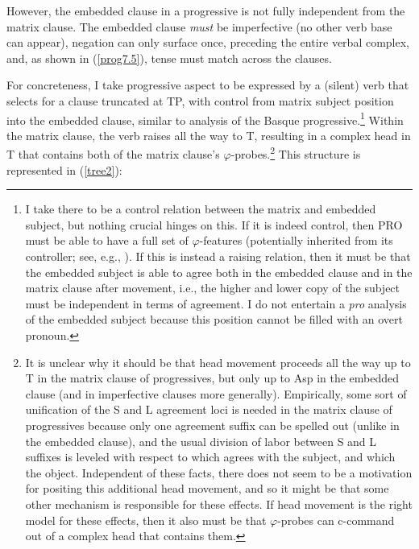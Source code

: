 \documentclass[output=paper
,modfonts
,nonflat]{langsci/langscibook}
\begin{document}
\noindent However, the embedded clause in a progressive is not fully independent from the matrix clause. The embedded clause \textit{must} be imperfective (no other verb base can appear), negation can only surface once, preceding the entire verbal complex, and, as shown in (\ref{prog7.5}), tense must match across the clauses.

\eal \label{prog7.5}
\zl
For concreteness, I take progressive aspect to be expressed by a (silent) verb that selects for a clause truncated at TP, with control from matrix subject position into the embedded clause, similar to  analysis of the Basque progressive.\footnote{I take there to be a control relation between the matrix and embedded subject, but nothing crucial hinges on this. If it is indeed control, then PRO must be able to have a full set of $\varphi$-features (potentially inherited from its controller; see, e.g., \citealt{Ussery08}). If this is instead a raising relation, then it must be that the embedded subject is able to agree both in the embedded clause and in the matrix clause after movement, i.e., the higher and lower copy of the subject must be independent in terms of agreement. I do not entertain a \textit{pro} analysis of the embedded subject because this position cannot be filled with an overt pronoun.} Within the matrix clause, the verb raises all the way to T, resulting in a complex head in T that contains both of the matrix clause's $\varphi$-probes.\footnote{It is unclear why it should be that head movement proceeds all the way up to T in the matrix clause of progressives, but only up to Asp in the embedded clause (and in imperfective clauses more generally). Empirically, some sort of unification of the S and L agreement loci is needed in the matrix clause of progressives because only one agreement suffix can be spelled out (unlike in the embedded clause), and the usual division of labor between S and L suffixes is leveled with respect to which agrees with the subject, and which the object. Independent of these facts, there does not seem to be a motivation for positing this additional head movement, and so it might be that some other mechanism is responsible for these effects. If head movement is the right model for these effects, then it also must be that $\varphi$-probes can c-command out of a complex head that contains them.} This structure is represented in (\ref{tree2}):
\end{document}
